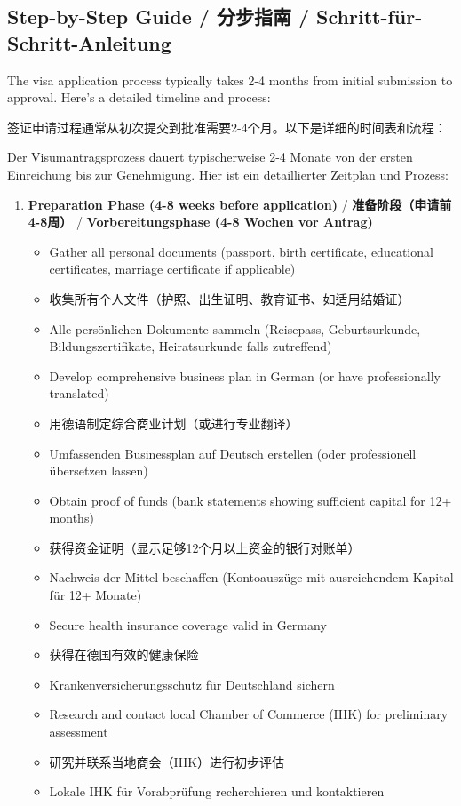 \subsection{Step-by-Step Guide / 分步指南 / Schritt-für-Schritt-Anleitung}

The visa application process typically takes 2-4 months from initial submission to approval. Here's a detailed timeline and process:

签证申请过程通常从初次提交到批准需要2-4个月。以下是详细的时间表和流程：

Der Visumantragsprozess dauert typischerweise 2-4 Monate von der ersten Einreichung bis zur Genehmigung. Hier ist ein detaillierter Zeitplan und Prozess:

\begin{enumerate}
    \item \textbf{Preparation Phase (4-8 weeks before application)} / \textbf{准备阶段（申请前4-8周）} / \textbf{Vorbereitungsphase (4-8 Wochen vor Antrag)}
    \begin{itemize}
        \item Gather all personal documents (passport, birth certificate, educational certificates, marriage certificate if applicable)
        \item 收集所有个人文件（护照、出生证明、教育证书、如适用结婚证）
        \item Alle persönlichen Dokumente sammeln (Reisepass, Geburtsurkunde, Bildungszertifikate, Heiratsurkunde falls zutreffend)
        \item Develop comprehensive business plan in German (or have professionally translated)
        \item 用德语制定综合商业计划（或进行专业翻译）
        \item Umfassenden Businessplan auf Deutsch erstellen (oder professionell übersetzen lassen)
        \item Obtain proof of funds (bank statements showing sufficient capital for 12+ months)
        \item 获得资金证明（显示足够12个月以上资金的银行对账单）
        \item Nachweis der Mittel beschaffen (Kontoauszüge mit ausreichendem Kapital für 12+ Monate)
        \item Secure health insurance coverage valid in Germany
        \item 获得在德国有效的健康保险
        \item Krankenversicherungsschutz für Deutschland sichern
        \item Research and contact local Chamber of Commerce (IHK) for preliminary assessment
        \item 研究并联系当地商会（IHK）进行初步评估
        \item Lokale IHK für Vorabprüfung recherchieren und kontaktieren
    \end{itemize}
    

\end{enumerate}
